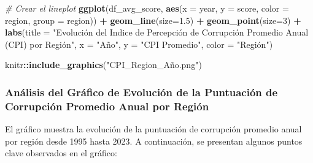 \documentclass[
]{article}
\newenvironment{Shaded}{\begin{snugshade}}{\end{snugshade}}
\newcommand{\AttributeTok}[1]{\textcolor[rgb]{0.13,0.29,0.53}{#1}}
\newcommand{\CommentTok}[1]{\textcolor[rgb]{0.56,0.35,0.01}{\textit{#1}}}
\newcommand{\DecValTok}[1]{\textcolor[rgb]{0.00,0.00,0.81}{#1}}
\newcommand{\FloatTok}[1]{\textcolor[rgb]{0.00,0.00,0.81}{#1}}
\newcommand{\FunctionTok}[1]{\textcolor[rgb]{0.13,0.29,0.53}{\textbf{#1}}}
\newcommand{\NormalTok}[1]{#1}
\newcommand{\SpecialCharTok}[1]{\textcolor[rgb]{0.81,0.36,0.00}{\textbf{#1}}}
\newcommand{\StringTok}[1]{\textcolor[rgb]{0.31,0.60,0.02}{#1}}
\begin{document}
\begin{Shaded}
\begin{Highlighting}[]
\CommentTok{\# Crear el lineplot}
\FunctionTok{ggplot}\NormalTok{(df\_avg\_score, }\FunctionTok{aes}\NormalTok{(}\AttributeTok{x =}\NormalTok{ year, }\AttributeTok{y =}\NormalTok{ score, }\AttributeTok{color =}\NormalTok{ region, }\AttributeTok{group =}\NormalTok{ region)) }\SpecialCharTok{+}
    \FunctionTok{geom\_line}\NormalTok{(}\AttributeTok{size=}\FloatTok{1.5}\NormalTok{) }\SpecialCharTok{+}
    \FunctionTok{geom\_point}\NormalTok{(}\AttributeTok{size=}\DecValTok{3}\NormalTok{) }\SpecialCharTok{+}
    \FunctionTok{labs}\NormalTok{(}\AttributeTok{title =} \StringTok{"Evolución del Indice de Percepción de Corrupción Promedio Anual (CPI) por Región"}\NormalTok{,}
         \AttributeTok{x =} \StringTok{"Año"}\NormalTok{,}
         \AttributeTok{y =} \StringTok{"CPI Promedio"}\NormalTok{,}
         \AttributeTok{color =} \StringTok{"Región"}\NormalTok{)}
         
\NormalTok{knitr}\SpecialCharTok{::}\FunctionTok{include\_graphics}\NormalTok{(}\StringTok{"CPI\_Region\_Año.png"}\NormalTok{)}
\end{Highlighting}
\end{Shaded}

\subsubsection{Análisis del Gráfico de Evolución de la Puntuación de
Corrupción Promedio Anual por
Región}\label{anuxe1lisis-del-gruxe1fico-de-evoluciuxf3n-de-la-puntuaciuxf3n-de-corrupciuxf3n-promedio-anual-por-regiuxf3n}

El gráfico muestra la evolución de la puntuación de corrupción promedio
anual por región desde 1995 hasta 2023. A continuación, se presentan
algunos puntos clave observados en el gráfico:
\end{document}
